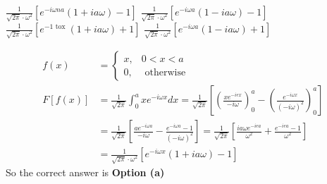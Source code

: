 \begin{enumerate}
\begin{tasks}
		\task[\textbf{a.}]$\frac{1}{\sqrt{2 \pi} \cdot \omega^{2}}\left[e^{-i \omega n a}(1+i a \omega)-1\right]$
		\task[\textbf{b.}]$\frac{1}{\sqrt{2 \pi} \cdot \omega^{2}}\left[e^{-i \omega a}(1-i a \omega)-1\right]$
		\task[\textbf{c.}] $\frac{1}{\sqrt{2 \pi} \cdot \omega^{2}}\left[e^{-1 \text { tox }}(1+i a \omega)+1\right]$
		\task[\textbf{d.}] $\frac{1}{\sqrt{2 \pi} \cdot \omega^{2}}\left[e^{-i \omega a}(1-i a \omega)+1\right]$
	\end{tasks}
	\begin{answer}
	\begin{align*}
	f(x)&= \begin{cases}x, & 0<x<a \\ 0, & \text { otherwise }\end{cases}\\
	F[f(x)]&=\frac{1}{\sqrt{2 \pi}} \int_{0}^{a} x e^{-i \omega x} d x=\frac{1}{\sqrt{2 \pi}}\left[\left(\frac{x e^{-i e x}}{-i \omega}\right)_{0}^{a}-\left(\frac{e^{-i \omega x}}{(-i \omega)^{2}}\right)_{0}^{a}\right]\\&=\frac{1}{\sqrt{2 \pi}}\left[\frac{a e^{-i \omega a}}{-i \omega}-\frac{e^{-i \omega a}-1}{(-i \omega)^{2}}\right]=\frac{1}{\sqrt{2 \pi}}\left[\frac{i a \omega e^{-i e a}}{\omega^{2}}+\frac{e^{-i e a}-1}{\omega^{2}}\right]\\
	&=\frac{1}{\sqrt{2 \pi} \cdot \omega^{2}}\left[e^{-i \omega x}(1+i a \omega)-1\right]
	\end{align*}
	So the correct answer is \textbf{Option (a)}
\end{answer}
\end{enumerate}
